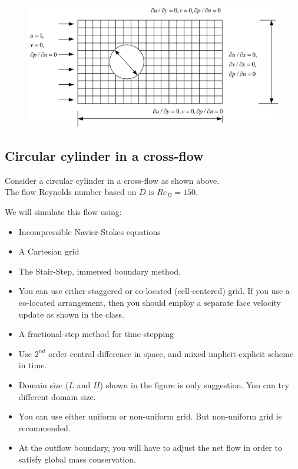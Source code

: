 \documentclass[12pt]{article}
\begin{document}
\begin{figure}[H]
    \centering
    \includegraphics[width=1\textwidth]{figure/problem.jpg}
    \label{IGs.jpg}
\end{figure}



\subsection*{Circular cylinder in a cross-flow}
Consider a circular cylinder in a cross-flow as shown above.\\
The flow Reynolds number based on \(D\) is \(Re_D = 150\).

We will simulate this flow using:
\begin{itemize}
    \item Incompressible Navier-Stokes equations
    \item A Cartesian grid
    \item The Stair-Step, immersed boundary method.
    \item You can use either staggered or co-located (cell-centered) grid. If you use a co-located arrangement, then you should employ a separate face velocity update as shown in the class.
    \item A fractional-step method for time-stepping
    \item Use \(2^{nd}\) order central difference in space, and mixed implicit-explicit scheme in time.
    \item Domain size (\(L\) and \(H\)) shown in the figure is only suggestion. You can try different domain size.
    \item You can use either uniform or non-uniform grid. But non-uniform grid is recommended.
    \item At the outflow boundary, you will have to adjust the net flow in order to satisfy global mass conservation.
\end{itemize}
\end{document}
